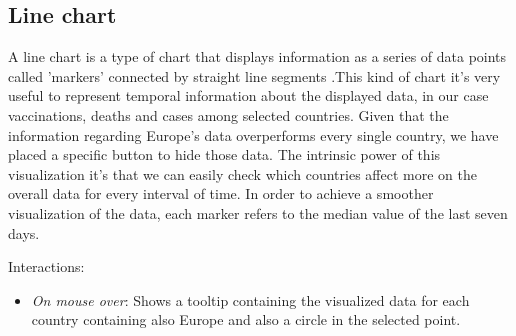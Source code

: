 \documentclass[10pt,conference]{IEEEtran}
\begin{document}
\begin{figure}
\end{figure}

\subsection{Line chart}
A line chart is a type of chart that displays information as a series of data points called ’markers’ connected by straight 
line segments \cite{line}.This kind of chart it’s very useful to represent temporal information about the displayed data,
in our case vaccinations, deaths and cases among selected countries. Given that the information regarding Europe's data 
overperforms every single country, we have placed a specific button to hide those data. The intrinsic power of this visualization it’s 
that we can easily check which countries affect more on the overall data for every interval of time.
In order to achieve a smoother visualization of the data, each marker refers to the median value of the last seven days.

Interactions:
\begin{itemize}
	\item {\em On mouse over}: Shows a tooltip containing the visualized data for each country containing also Europe and also a circle in the selected point.
\end{itemize}
\end{document}
